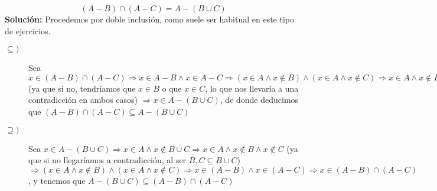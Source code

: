 \begin{ejercicio}
    \begin{equation*}
        (A-B)\cap(A-C) = A-(B\cup C)
    \end{equation*}
    \textbf{Solución:}
    Procedemos por doble inclusión, como suele ser habitual en este tipo de ejercicios.
    \begin{description}
        \item [$\subseteq)$] Sea $x\in (A-B)\cap(A-C)\Longrightarrow x\in A-B\land x\in A-C\Longrightarrow {(x\in A\land x\notin B)}\land{(x\in A\land x\notin C)}\Longrightarrow x\in A\land x\notin B\cup C$ (ya que si no, tendríamos que $x\in B$ o que $x\in C$, lo que nos llevaría a una contradicción en ambos casos) $\Longrightarrow x\in A-(B\cup C)$, de donde deducimos que $(A-B)\cap (A-C)\subseteq A-(B\cup C)$
    \item [$\supseteq)$] Sea $x\in A-(B\cup C)\Longrightarrow x\in A\land x\notin B\cup C \Longrightarrow x\in A\land x\notin B \land x\notin C$ (ya que si no llegaríamos a contradicción, al ser $B,C\subseteq B\cup C$) $\Longrightarrow {(x\in A\land x\notin B)}\land {(x\in A\land x\notin C)}\Longrightarrow x\in (A-B)\land x\in (A-C)\Longrightarrow x\in (A-B)\cap (A-C)$, y tenemos que $A-(B\cup C)\subseteq (A-B)\cap (A-C)$
    \end{description}
\end{ejercicio}

